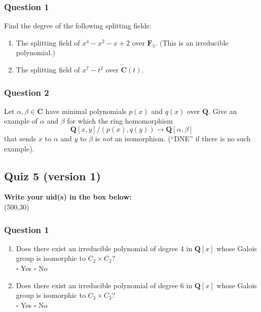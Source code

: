\documentclass[11pt]{article}
\begin{document}
\vspace{1cm}
\subsubsection{Question 1}
\label{sec:orgfc40cae}
Find the degree of the following splitting fields:

\begin{enumerate}
\item The splitting field of \(x^4-x^2-x+2\) over \(\mathbf{F}_5\).  (This is an irreducible polynomial.)

\vspace{3cm}

\item The splitting field of \(x^7 - t^2\) over \(\mathbf{C}(t)\).

\vspace{3cm}
\end{enumerate}
\subsubsection{Question 2}
\label{sec:org6aa44c1}

Let \(\alpha, \beta \in \mathbf{C}\) have minimal polynomials \(p(x)\) and \(q(x)\) over \(\mathbf{Q}\).
Give an example of \(\alpha\) and \(\beta\) for which the ring homomorphism
\[ \mathbf{Q}[x,y]/(p(x), q(y)) \to \mathbf{Q}[\alpha,\beta]\]
that sends \(x\) to \(\alpha\) and \(y\) to \(\beta\) is \emph{not} an isomorphism.
(``DNE'' if there is no such example).
\subsection{Quiz 5 (version 1)}
\label{sec:org77945f6}
\vspace{1cm}

\noindent
\textbf{Write your uid(s) in the box below:}\\
\framebox(500,30)

\vspace{1cm}
\subsubsection{Question 1}
\label{sec:orge767bd7}
\begin{enumerate}
\item Does there exist an irreducible polynomial of degree 4 in \(\mathbf{Q}[x]\) whose Galois group is isomorphic to \(C_2 \times C_2\)?\\

\qquad \(\square\) Yes \qquad \(\square\)   No \\

\item Does there exist an irreducible polynomial of degree 6 in \(\mathbf{Q}[x]\) whose Galois group is isomorphic to \(C_3 \times C_3\)?\\

\qquad \(\square\) Yes \qquad \(\square\)   No \\
\end{enumerate}
\end{document}
